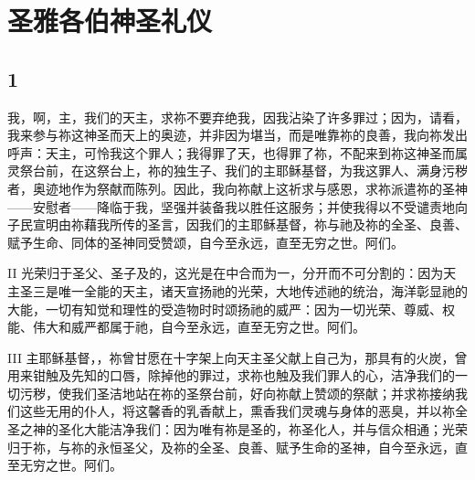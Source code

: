 
\chapter{圣雅各伯神圣礼仪}



\section{1}

\par

我，啊，主，我们的天主，求祢不要弃绝我，因我沾染了许多罪过；因为，请看，我来参与祢这神圣而天上的奥迹，并非因为堪当，而是唯靠祢的良善，我向祢发出呼声：天主，可怜我这个罪人；我得罪了天，也得罪了祢，不配来到祢这神圣而属灵祭台前，在这祭台上，祢的独生子、我们的主耶稣基督，为我这罪人、满身污秽者，奥迹地作为祭献而陈列。因此，我向祢献上这祈求与感恩，求祢派遣祢的圣神——安慰者——降临于我，坚强并装备我以胜任这服务；并使我得以不受谴责地向子民宣明由祢藉我所传的圣言，因我们的主耶稣基督，祢与祂及祢的全圣、良善、赋予生命、同体的圣神同受赞颂，自今至永远，直至无穷之世。阿们。\par

\par

II 光荣归于圣父、圣子及的，这光是在中合而为一，分开而不可分割的：因为天主圣三是唯一全能的天主，诸天宣扬祂的光荣，大地传述祂的统治，海洋彰显祂的大能，一切有知觉和理性的受造物时时颂扬祂的威严：因为一切光荣、尊威、权能、伟大和威严都属于祂，自今至永远，直至无穷之世。阿们。\par

\par

III 主耶稣基督，，祢曾甘愿在十字架上向天主圣父献上自己为，那具有的火炭，曾用来钳触及先知的口唇，除掉他的罪过，求祢也触及我们罪人的心，洁净我们的一切污秽，使我们圣洁地站在祢的圣祭台前，好向祢献上赞颂的祭献；并求祢接纳我们这些无用的仆人，将这馨香的乳香献上，熏香我们灵魂与身体的恶臭，并以祢全圣之神的圣化大能洁净我们：因为唯有祢是圣的，祢圣化人，并与信众相通；光荣归于祢，与祢的永恒圣父，及祢的全圣、良善、赋予生命的圣神，自今至永远，直至无穷之世。阿们。\par

